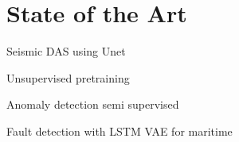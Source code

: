 \section{State of the Art}

Seismic DAS using Unet \cite{zhu2023seismic}

Unsupervised pretraining \cite{alaaDeepLstm2019}

Anomaly detection semi supervised \cite{huang2021esad}

Fault detection with LSTM VAE for maritime \cite{9514856} 
